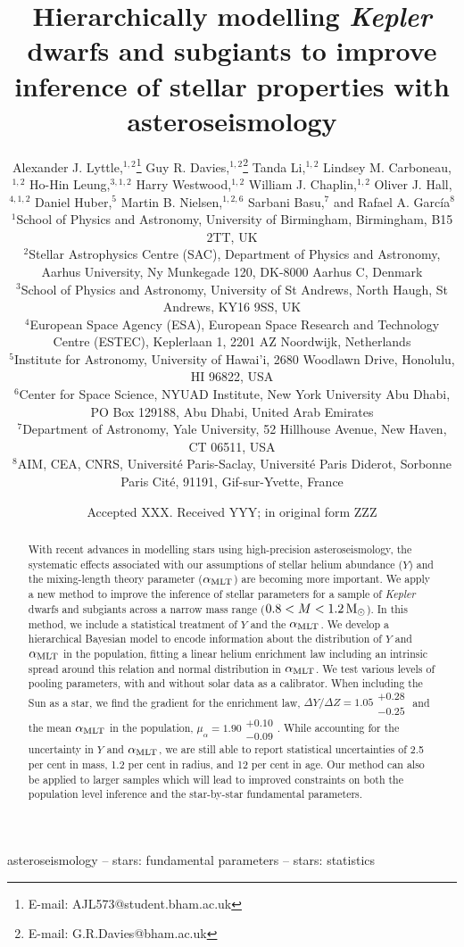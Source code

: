 \documentclass[fleqn,usenatbib]{mnras}
\title[Hierarchically modelling dwarf and subgiant stars]{%
    Hierarchically modelling \emph{Kepler} dwarfs and subgiants to improve inference of stellar properties with asteroseismology
}
\author[A. J. Lyttle et al.]{%
Alexander J. Lyttle,$^{1,2}$\thanks{E-mail: AJL573@student.bham.ac.uk}
Guy R. Davies,$^{1,2}$\thanks{E-mail: G.R.Davies@bham.ac.uk}
Tanda Li,$^{1,2}$
Lindsey M. Carboneau,$^{1,2}$
\newauthor
Ho-Hin Leung,$^{3,1,2}$
Harry Westwood,$^{1,2}$
William J. Chaplin,$^{1,2}$
Oliver J. Hall,$^{4,1,2}$
\newauthor
Daniel Huber,$^{5}$
Martin B. Nielsen,$^{1,2,6}$
Sarbani Basu,$^{7}$
and Rafael A. Garc\'ia$^{8}$
\\
$^{1}$School of Physics and Astronomy, University of Birmingham, Birmingham, B15 2TT, UK\\
$^{2}$Stellar Astrophysics Centre (SAC), Department of Physics and Astronomy, Aarhus University, Ny Munkegade 120, DK-8000 Aarhus C, Denmark\\
$^{3}$School of Physics and Astronomy, University of St Andrews, North Haugh, St Andrews, KY16 9SS, UK\\
$^{4}$European Space Agency (ESA), European Space Research and Technology Centre (ESTEC), Keplerlaan 1, 2201 AZ Noordwijk, Netherlands\\
$^{5}$Institute for Astronomy, University of Hawai'i, 2680 Woodlawn Drive, Honolulu, HI 96822, USA\\
$^{6}$Center for Space Science, NYUAD Institute, New York University Abu Dhabi, PO Box 129188, Abu Dhabi, United Arab Emirates\\
$^{7}$Department of Astronomy, Yale University, 52 Hillhouse Avenue, New Haven, CT 06511, USA\\
$^{8}$AIM, CEA, CNRS, Universit\'e Paris-Saclay, Universit\'e Paris Diderot, Sorbonne Paris Cit\'e, 91191, Gif-sur-Yvette, France\\
}
\date{Accepted XXX. Received YYY; in original form ZZZ}
\begin{document}
\label{firstpage}
\pagerange{\pageref{firstpage}--\pageref{lastpage}}
\maketitle

\begin{abstract}
    With recent advances in modelling stars using high-precision asteroseismology, the systematic effects associated with our assumptions of stellar helium abundance ($Y$) and the mixing-length theory parameter ($\alpha_{\rm MLT}$) are becoming more important. We apply a new method to improve the inference of stellar parameters for a sample of \emph{Kepler} dwarfs and subgiants across a narrow mass range ($0.8 < M < 1.2\,\rm M_\odot$). In this method, we include a statistical treatment of $Y$ and the $\alpha_{\rm MLT}$. We develop a hierarchical Bayesian model to encode information about the distribution of $Y$ and $\alpha_{\rm MLT}$ in the population, fitting a linear helium enrichment law including an intrinsic spread around this relation and normal distribution in $\alpha_{\rm MLT}$. We test various levels of pooling parameters, with and without solar data as a calibrator. When including the Sun as a star, we find the gradient for the enrichment law, $\Delta Y / \Delta Z = 1.05\substack{+0.28\\-0.25}$ and the mean $\alpha_{\rm MLT}$ in the population, $\mu_\alpha = 1.90\substack{+0.10\\-0.09}$. While accounting for the uncertainty in $Y$ and $\alpha_{\rm MLT}$, we are still able to report statistical uncertainties of 2.5 per cent in mass, 1.2 per cent in radius, and 12 per cent in age. Our method can also be applied to larger samples which will lead to improved constraints on both the population level inference and the star-by-star fundamental parameters.
\end{abstract}

\begin{keywords}

asteroseismology -- stars: fundamental parameters -- stars: statistics

\end{keywords}


\end{document}
